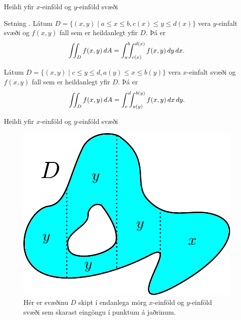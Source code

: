 \begin{frame}{Heildi yfir $x$-einföld og $y$-einföld svæði} 

\begin {block}{Setning \kaflanr.}
Látum 
$D=\{(x,y)\mid a\leq x\leq b, c(x)\leq y\leq d(x)\}$
vera $y$-einfalt svæði og $f(x,y)$ fall sem er heildanlegt yfir $D$.  Þá er 
$$\int\!\!\!\int_D f(x,y)\,dA=\int_a^b\!\!\!\int_{c(x)}^{d(x)}f(x,y)\,dy\, dx.$$


\medskip
Látum 
$D=\{(x,y)\mid c\leq y\leq d, a(y)\leq x\leq b(y)\}$
vera $x$-einfalt svæði og $f(x,y)$ fall sem er heildanlegt yfir $D$.  Þá er 
$$\int\!\!\!\int_D f(x,y)\,dA=\int_c^d\!\!\!\int_{a(y)}^{b(y)}f(x,y)\,dx\, dy.$$

\end{block}

\end{frame}

\begin {frame}{Heildi yfir $x$-einföld og $y$-einföld svæði}
 \begin {figure}[h!]
 \centering
            \includegraphics[width=0.35\linewidth]{einfalt2}
            \caption*{Hér er svæðinu $D$ skipt í endanlega mörg $x$-einföld og $y$-einföld svæði sem skarast eingöngu í punktum á jaðrinum.}
\end {figure}
\end {frame}


